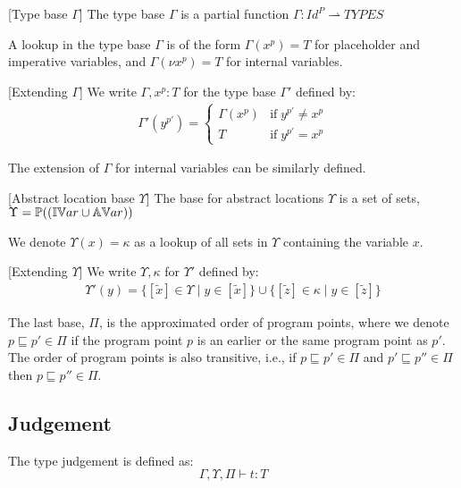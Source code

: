\documentclass[../../master.tex]{subfiles}
\begin{document}
\begin{definition}{[Type base $\Gamma$]}
	The type base $\Gamma$ is a partial function $\Gamma:Id^P\rightharpoonup TYPES$
\end{definition}

A lookup in the type base $\Gamma$ is of the form $\Gamma(x^p)=T$ for placeholder and imperative variables, and $\Gamma(\nu x^p)=T$ for internal variables.

\begin{definition}{[Extending $\Gamma$]}
	We write $\Gamma,x^p:T$ for the type base $\Gamma'$ defined by:
	\begin{align*}
		\Gamma'(y^{p'})=
		\left\{\begin{matrix}
			\Gamma(x^p) & \mbox{if}\;y^{p'} \neq x^{p}\\ 
			T & \mbox{if}\;y^{p'} = x^{p}
		\end{matrix}\right.
	\end{align*}
\end{definition}
The extension of $\Gamma$ for internal variables can be similarly defined.
\bigskip

\begin{definition}{[Abstract location base $\Upsilon$]}
	The base for abstract locations $\Upsilon$ is a set of sets, $\Upsilon=\mathbb{P}((\mathbb{IV}ar\cup\mathbb{AV}ar))$
\end{definition}
We denote $\Upsilon(x)=\kappa$ as a lookup of all sets in $\Upsilon$ containing the variable $x$.

\begin{definition}{[Extending $\Upsilon$]}
	We write $\Upsilon,\kappa$ for $\Upsilon'$ defined by:
	\begin{align*}
		\Upsilon'(y)=\{[\tilde{x}]\in\Upsilon \mid y\in[\tilde{x}]\} \cup \{[\tilde{z}]\in\kappa \mid y\in[\tilde{z}]\}
	\end{align*}
\end{definition}
\bigskip

The last base, $\Pi$, is the approximated order of program points, where we denote $p\sqsubseteq p'\in\Pi$ if the program point $p$ is an earlier or the same program point as $p'$.
The order of program points is also transitive, i.e., if $p\sqsubseteq p'\in\Pi$ and $p'\sqsubseteq p''\in\Pi$ then $p\sqsubseteq p''\in\Pi$.


\subsection{Judgement}
The type judgement is defined as:
$$\Gamma,\Upsilon,\Pi\vdash t: T$$
\end{document}

